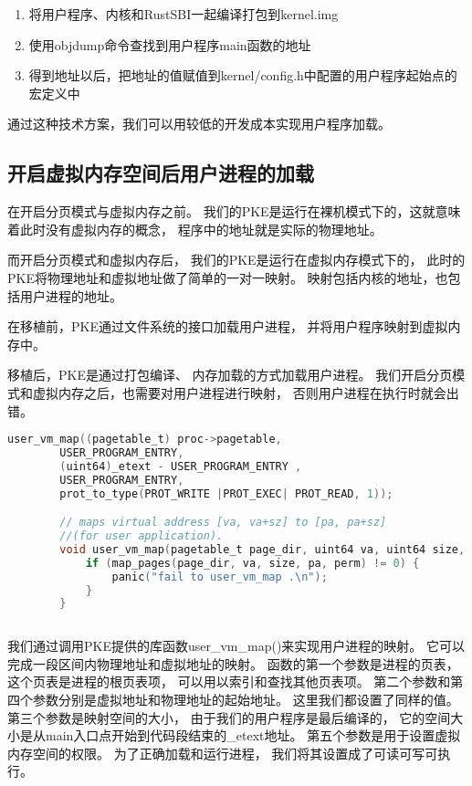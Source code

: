 \begin{enumerate}
    \item 将用户程序、内核和RustSBI一起编译打包到kernel.img
    \item 使用objdump命令查找到用户程序main函数的地址
    \item 得到地址以后，把地址的值赋值到kernel/config.h中配置的用户程序起始点的宏定义中
\end{enumerate}

通过这种技术方案，我们可以用较低的开发成本实现用户程序加载。

\subsection{开启虚拟内存空间后用户进程的加载}

在开启分页模式与虚拟内存之前。
我们的PKE是运行在裸机模式下的，这就意味着此时没有虚拟内存的概念，
程序中的地址就是实际的物理地址。

而开启分页模式和虚拟内存后，
我们的PKE是运行在虚拟内存模式下的，
此时的PKE将物理地址和虚拟地址做了简单的一对一映射。
映射包括内核的地址，也包括用户进程的地址。

在移植前，PKE通过文件系统的接口加载用户进程，
并将用户程序映射到虚拟内存中。

移植后，PKE是通过打包编译、
内存加载的方式加载用户进程。
我们开启分页模式和虚拟内存之后，也需要对用户进程进行映射，
否则用户进程在执行时就会出错。

\begin{lstlisting}[caption={用户进程地址映射}, label={lst:user_process_map}, language=C]
    user_vm_map((pagetable_t) proc->pagetable,
        USER_PROGRAM_ENTRY, 
        (uint64)_etext - USER_PROGRAM_ENTRY ,
        USER_PROGRAM_ENTRY,
        prot_to_type(PROT_WRITE |PROT_EXEC| PROT_READ, 1)); 

        // maps virtual address [va, va+sz] to [pa, pa+sz] 
        //(for user application).
        void user_vm_map(pagetable_t page_dir, uint64 va, uint64 size, uint64 pa, int perm) {
            if (map_pages(page_dir, va, size, pa, perm) != 0) {
                panic("fail to user_vm_map .\n");
            }
        }
               
\end{lstlisting}

我们通过调用PKE提供的库函数user\_vm\_map()来实现用户进程的映射。
它可以完成一段区间内物理地址和虚拟地址的映射。
函数的第一个参数是进程的页表，这个页表是进程的根页表项，
可以用以索引和查找其他页表项。
第二个参数和第四个参数分别是虚拟地址和物理地址的起始地址。
这里我们都设置了同样的值。
第三个参数是映射空间的大小，
由于我们的用户程序是最后编译的，
它的空间大小是从main入口点开始到代码段结束的\_etext地址。
第五个参数是用于设置虚拟内存空间的权限。
为了正确加载和运行进程，
我们将其设置成了可读可写可执行。


